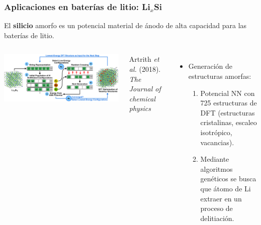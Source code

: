 \documentclass[aspectratio=169]{beamer}
\let\oldtextbf\textbf
\renewcommand{\textbf}[1]{\textcolor{nordblue}{\oldtextbf{#1}}}
\begin{document}
    \begin{frame}
        \frametitle{Aplicaciones en baterías de litio: Li$_x$Si}
        
        El \textbf{silicio} amorfo es un potencial material de ánodo de alta
        capacidad para las baterías de litio.
        
        \begin{columns}
            \begin{center}
                \includegraphics[width=\columnwidth]{LiSi-metodo.png}
            \end{center}
            \tiny{Artrith \textit{et al.} (2018). \textit{The Journal of chemical
            physics}}

            \begin{itemize}
                \item Generación de estructuras amorfas:
                    \begin{enumerate}
                        \item Potencial NN con 725 estructuras de DFT (estructuras
                            cristalinas, escaleo isotrópico, vacancias).
                        \item Mediante algoritmos genéticos se busca que átomo 
                            de Li extraer en un proceso de delitiación.
                    \end{enumerate}
            \end{itemize}
        \end{columns}
            
    \end{frame}
    
\end{document}
